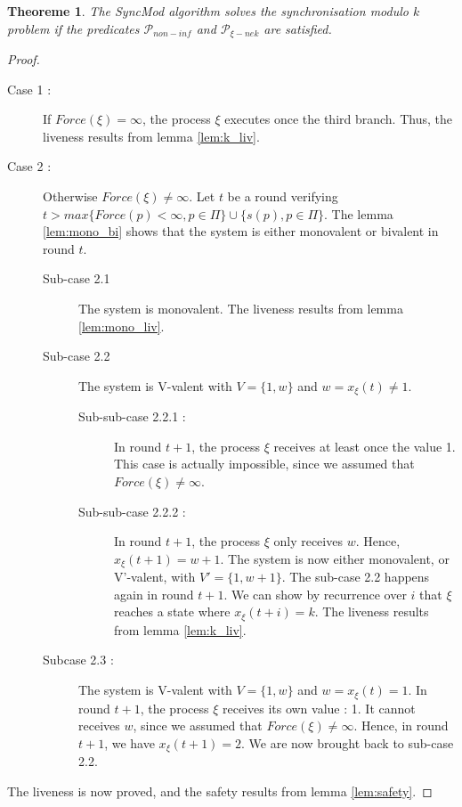 \documentclass{article}
\newtheorem{theorem}{Theoreme}
\begin{document}
\begin{theorem}
	The SyncMod algorithm solves the synchronisation modulo $k$ problem if the predicates $\mathcal{P}_{non-inf}$
	and $\mathcal{P}_{\xi-nek}$ are satisfied.
\end{theorem}
\begin{proof}
	\begin{description}
		\item[Case 1 : ] If $Force(\xi) = \infty$, the process $\xi$ executes once the third branch.
			Thus, the liveness results from lemma \ref{lem:k_liv}.

		\item[Case 2 :] Otherwise $Force(\xi) \neq \infty$.
			Let $t$ be a round verifying $t > max \{Force(p) < \infty, p \in \Pi\} \cup \{s(p), p \in \Pi\}$.
			The lemma \ref{lem:mono_bi} shows that the system is either monovalent or bivalent in round $t$.
			\begin{description}
				\item[Sub-case 2.1] The system is monovalent. The liveness results from lemma \ref{lem:mono_liv}.
				\item[Sub-case 2.2] The system is V-valent with $V = \{1, w\}$ and $w = x_\xi(t) \neq 1$.
					\begin{description}
						\item[Sub-sub-case 2.2.1 : ] In round $t+1$, the process $\xi$ receives at least once
							the value 1.
							This case is actually impossible, since we assumed that $Force(\xi) \neq \infty$.
						\item[Sub-sub-case 2.2.2 : ] In round $t+1$, the process $\xi$ only receives $w$.
							Hence, $x_\xi(t+1) = w+1$. The system is now either monovalent,
							or V'-valent, with $V' = \{1, w+1\}$.
							The sub-case 2.2 happens again in round $t+1$.
							We can show by recurrence over $i$ that $\xi$ reaches a state where $x_\xi(t+i) = k$.
							The liveness results from lemma \ref{lem:k_liv}.
					\end{description}
				\item[Subcase 2.3 : ] The system is V-valent with $V = \{1, w\}$ and $w = x_\xi(t) = 1$.
					In round $t+1$, the process $\xi$ receives its own value : 1.
					It cannot receives $w$, since we assumed that $Force(\xi) \neq \infty$.
					Hence, in round $t+1$, we have $x_\xi(t+1) = 2$.
					We are now brought back to sub-case 2.2.
			\end{description}
	\end{description}
	The liveness is now proved, and the safety results from lemma \ref{lem:safety}.
\end{proof}
\end{document}
